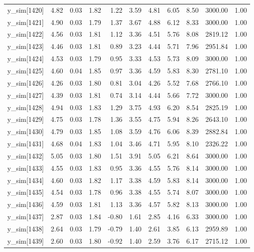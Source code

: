 \begin{table}[ht]
\begin{tabular}{rrrrrrrrrrr}
  y\_sim[1420] & 4.82 & 0.03 & 1.82 & 1.22 & 3.59 & 4.81 & 6.05 & 8.50 & 3000.00 & 1.00 \\ 
  y\_sim[1421] & 4.90 & 0.03 & 1.79 & 1.37 & 3.67 & 4.88 & 6.12 & 8.33 & 3000.00 & 1.00 \\ 
  y\_sim[1422] & 4.56 & 0.03 & 1.81 & 1.12 & 3.36 & 4.51 & 5.76 & 8.08 & 2819.12 & 1.00 \\ 
  y\_sim[1423] & 4.46 & 0.03 & 1.81 & 0.89 & 3.23 & 4.44 & 5.71 & 7.96 & 2951.84 & 1.00 \\ 
  y\_sim[1424] & 4.53 & 0.03 & 1.79 & 0.95 & 3.33 & 4.53 & 5.73 & 8.09 & 3000.00 & 1.00 \\ 
  y\_sim[1425] & 4.60 & 0.04 & 1.85 & 0.97 & 3.36 & 4.59 & 5.83 & 8.30 & 2781.10 & 1.00 \\ 
  y\_sim[1426] & 4.26 & 0.03 & 1.80 & 0.81 & 3.04 & 4.26 & 5.52 & 7.68 & 2766.10 & 1.00 \\ 
  y\_sim[1427] & 4.39 & 0.03 & 1.81 & 0.74 & 3.14 & 4.44 & 5.66 & 7.72 & 3000.00 & 1.00 \\ 
  y\_sim[1428] & 4.94 & 0.03 & 1.83 & 1.29 & 3.75 & 4.93 & 6.20 & 8.54 & 2825.19 & 1.00 \\ 
  y\_sim[1429] & 4.75 & 0.03 & 1.78 & 1.36 & 3.55 & 4.75 & 5.94 & 8.26 & 2643.10 & 1.00 \\ 
  y\_sim[1430] & 4.79 & 0.03 & 1.85 & 1.08 & 3.59 & 4.76 & 6.06 & 8.39 & 2882.84 & 1.00 \\ 
  y\_sim[1431] & 4.68 & 0.04 & 1.83 & 1.04 & 3.46 & 4.71 & 5.95 & 8.10 & 2326.22 & 1.00 \\ 
  y\_sim[1432] & 5.05 & 0.03 & 1.80 & 1.51 & 3.91 & 5.05 & 6.21 & 8.64 & 3000.00 & 1.00 \\ 
  y\_sim[1433] & 4.55 & 0.03 & 1.83 & 0.95 & 3.36 & 4.55 & 5.76 & 8.14 & 3000.00 & 1.00 \\ 
  y\_sim[1434] & 4.60 & 0.03 & 1.82 & 1.17 & 3.38 & 4.59 & 5.83 & 8.14 & 3000.00 & 1.00 \\ 
  y\_sim[1435] & 4.54 & 0.03 & 1.78 & 0.96 & 3.38 & 4.55 & 5.74 & 8.07 & 3000.00 & 1.00 \\ 
  y\_sim[1436] & 4.59 & 0.03 & 1.81 & 1.13 & 3.36 & 4.57 & 5.82 & 8.13 & 3000.00 & 1.00 \\ 
  y\_sim[1437] & 2.87 & 0.03 & 1.84 & -0.80 & 1.61 & 2.85 & 4.16 & 6.33 & 3000.00 & 1.00 \\ 
  y\_sim[1438] & 2.64 & 0.03 & 1.79 & -0.79 & 1.40 & 2.61 & 3.85 & 6.13 & 2959.89 & 1.00 \\ 
  y\_sim[1439] & 2.60 & 0.03 & 1.80 & -0.92 & 1.40 & 2.59 & 3.76 & 6.17 & 2715.12 & 1.00 \\ 

\end{tabular}
\end{table}
